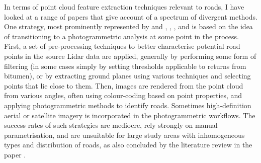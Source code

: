 In terms of point cloud feature extraction techniques relevant to roads, I have looked at a range of papers that give account of a spectrum of divergent methods. One strategy, most prominently represented by \cite{hu_2003} and \cite{hu_etal_2004}, \cite{zhu_mordohai_2009}, \cite{zhu_hyppa_2014}, and \cite{lin_etal_2015} is based on the idea of transitioning to a photogrammetric analysis at some point in the process. First, a set of pre-processing techniques to better characterise potential road points in the source Lidar data are applied, generally by performing some form of filtering (in some cases simply by setting thresholds applicable to returns from bitumen), or by extracting ground planes using various techniques and selecting points that lie close to them. Then, images are rendered from the point cloud from various angles, often using colour-coding based on point properties, and applying photogrammetric methods to identify roads. Sometimes high-definition aerial or satellite imagery is incorporated in the photogrammetric workflows. The success rates of such strategies are mediocre, rely strongly on manual parametrisation, and are unsuitable for large study areas with inhomogeneous types and distribution of roads, as also concluded by the literature review in the paper \cite{yang_etal_2013}.

